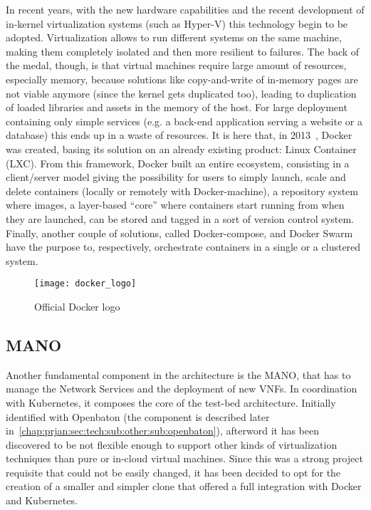 In recent years, with the new hardware capabilities and the recent development
of in-kernel virtualization systems (such as Hyper-V) this technology begin to
be adopted. Virtualization allows to run different systems on the same machine,
making them completely isolated and then more resilient to failures. The back of
the medal, though, is that virtual machines require large amount of resources,
especially memory, because solutions like copy-and-write of in-memory pages are
not viable anymore (since the kernel gets duplicated too), leading to
duplication of loaded libraries and assets in the memory of the host. For large
deployment containing only simple services (e.g. a back-end application serving
a website or a database) this ends up in a waste of resources.  It is here that,
in 2013~\cite{dockerWebsite}, Docker was created, basing its solution on an
already existing product: Linux Container (LXC). From this framework, Docker
built an entire ecosystem, consisting in a client/server model giving the
possibility for users to simply launch, scale and delete containers (locally or
remotely with Docker-machine), a repository system where images, a layer-based
``core'' where containers start running from when they are launched, can be
stored and tagged in a sort of version control system. Finally, another couple
of solutions, called Docker-compose, and Docker Swarm have the purpose to,
respectively, orchestrate containers in a single or a clustered system.
\begin{figure}[t]
 \centering \texttt{[image: docker\_logo]}
 \caption{Official Docker logo}
 \label{chap:intro:img:docker_logo}
\end{figure}

\vspace{0.5cm}


\subsection{MANO}

Another fundamental component in the architecture is the MANO, that has to 
manage the Network Services and the deployment of new VNFs. In coordination 
with Kubernetes, it composes the core of the test-bed architecture. Initially 
identified with Openbaton (the component is described later 
in~\ref{chap:prjan:sec:tech:sub:other:sub:openbaton}), afterword it has been 
discovered to be not flexible enough to support other kinds of virtualization 
techniques than pure or in-cloud virtual machines. 
Since this was a strong project requisite that could not be easily changed, it 
has been decided to opt for the creation of a smaller and simpler clone that 
offered a full integration with Docker and Kubernetes.


